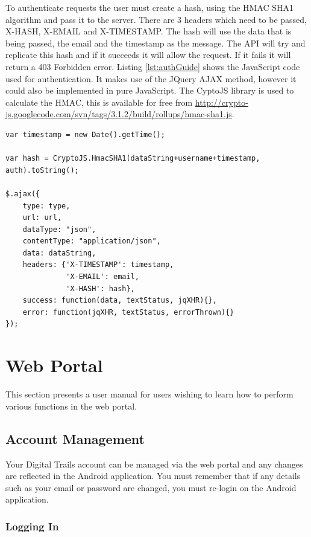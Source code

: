 \documentclass[11pt,a4paper]{report}
\begin{document}
To authenticate requests the user must create a hash, using the HMAC SHA1 algorithm and pass it to the server. There are 3 headers which need to be passed, X-HASH, X-EMAIL and X-TIMESTAMP. The hash will use the data that is being passed, the email and the timestamp as the message. The API will try and replicate this hash and if it succeeds it will allow the request. If it fails it will return a 403 Forbidden error. Listing \ref{lst:authGuide} shows the JavaScript code used for authentication. It makes use of the JQuery\cite{jQuery} AJAX method, however it could also be implemented in pure JavaScript. The CyptoJS library is used to calculate the HMAC, this is available for free from \url{http://crypto-js.googlecode.com/svn/tags/3.1.2/build/rollups/hmac-sha1.js}.

\begin{lstlisting}[captionpos=b, caption=JavaScript Authentication Code., label=lst:authGuide]
var timestamp = new Date().getTime();

var hash = CryptoJS.HmacSHA1(dataString+username+timestamp, auth).toString();

$.ajax({
    type: type,
    url: url,
    dataType: "json",
    contentType: "application/json",
    data: dataString,
    headers: {'X-TIMESTAMP': timestamp,
        	  'X-EMAIL': email,
        	  'X-HASH': hash},
    success: function(data, textStatus, jqXHR){},
    error: function(jqXHR, textStatus, errorThrown){}
});
\end{lstlisting}

\section{Web Portal}

This section presents a user manual for users wishing to learn how to perform various functions in the web portal.

\subsection{Account Management}

Your Digital Trails account can be managed via the web portal and any changes are reflected in the Android application. You must remember that if any details such as your email or password are changed, you must re-login on the Android application.

\subsubsection{Logging In}
\end{document}
